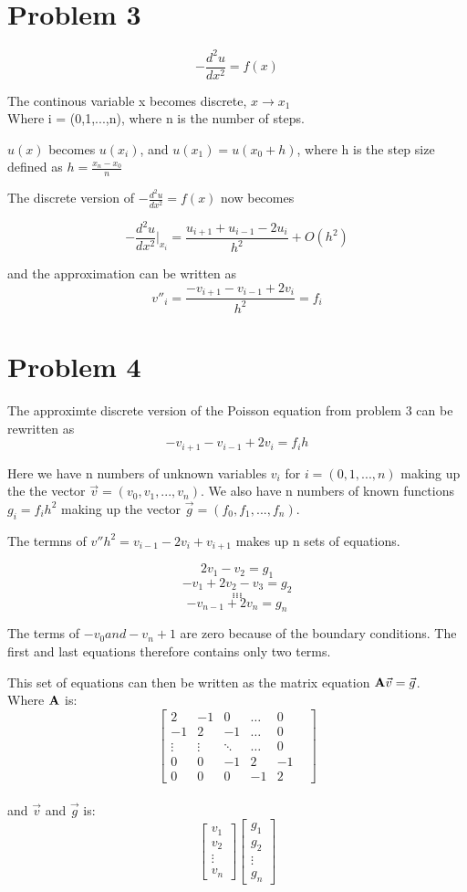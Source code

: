 \documentclass[english,notitlepage]{revtex4-1}  %
\begin{document}
\section{Problem 3}
\[-\frac{d^2u}{dx^2}=f(x)\]

The continous variable x becomes discrete, $x\rightarrow x_1$\\
Where i = (0,1,...,n), where n is the number of steps. 

$u(x)$ becomes $u(x_i)$, and $u(x_1)=u(x_0+h)$,
where h is the step size defined as $ h = \frac{x_n-x_0}{n}$

The discrete version of $-\frac{d^2u}{dx^2}= f(x)$ now becomes \

\[ -\frac{d^2u}{dx^2} \vert_{x_i}= \frac{u_{i+1} + u_{i-1} - 2u_i}{h^2} + O(h^2) \]

and the approximation can be written as 
\[v''_i = \frac{-v_{i+1}-v_{i-1}+2v_i}{h^2} = f_i\]


\section{Problem 4}

The approximte discrete version of the Poisson equation from problem 3 can be rewritten as \[-v_{i+1}-v_{i-1}+2v_i = f_i h\]

Here we have n numbers of unknown variables $v_i$ for $i=(0,1,...,n)$ making up the the vector $\vec{v}=(v_0,v_1,...,v_n)$. We also have n numbers of known functions $g_i = f_i h^2$ making up the vector $\vec{g}=(f_0,f_1,...,f_n)$. 

The termns of $v'' h^2 = v_{i-1}-2v_i+v_{i+1}$ makes up  n sets of equations. 

\[2v_1- v_2 = g_1\]
\[-v_1 + 2v_2 - v_3 = g_2\]
 \[ .  .  . \]
  \[.  .  . \]
  \[.  .  . \]
\[-v_{n-1} + 2v_n = g_n\]

The terms of $-v_0 and -v_n+1$ are zero because of the boundary conditions. The first and last equations therefore contains only two terms. 

This set of equations can then be written as the matrix equation $\vb{A}\vec{v} = \vec{g}$. \\
Where $\vb{A}$ is:
\[
\begin{bmatrix}
 2  & -1 & 0 &\dots & 0 \\
 -1 & 2  & -1 & \dots & 0 \\
 \vdots & \vdots & \ddots &\dots & 0 \\
 0 & 0 &-1 & 2 & -1 \\
 0 & 0 & 0& -1 & 2 & 
\end{bmatrix} \]\\
and $\vec{v}$ and $ \vec{g}$ is: 
\[\begin{bmatrix}
	v_1 \\ v_2 \\ \vdots \\ v_n
\end{bmatrix}\begin{bmatrix}
	g_1 \\ g_2 \\ \vdots \\ g_n
\end{bmatrix}\]
\end{document}
